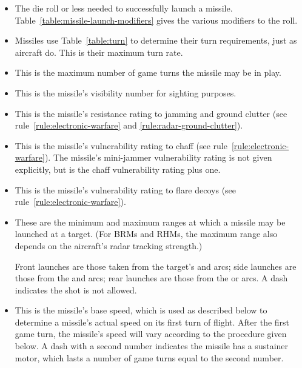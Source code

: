 {\begin{itemize}
    \item {} The die roll or less needed to successfully launch a missile. Table~\ref{table:missile-launch-modifiers} gives the various modifiers to the roll.

    \item {} Missiles use Table~\ref{table:turn} to determine their turn requirements, just as aircraft do. This is their maximum turn rate.

    \item {} This is the maximum number of game turns the missile may be in play.

    \item {} This is the missile’s visibility number for sighting purposes.

    \item {} This is the missile’s resistance rating to jamming and ground clutter (see rule~\ref{rule:electronic-warfare} and \ref{rule:radar-ground-clutter}).

    \item {} This is the missile’s vulnerability rating to chaff (see rule~\ref{rule:electronic-warfare}). The missile’s mini-jammer vulnerability rating is not given explicitly, but is the chaff vulnerability rating plus one.

    \item {} This is the missile’s vulnerability rating to flare decoys (see rule~\ref{rule:electronic-warfare}).

    \item {} These are the minimum and maximum ranges at which a missile may be launched at a target. (For BRMs and RHMs, the maximum range also depends on the aircraft’s radar tracking strength.)

    Front launches are those taken from the target’s  and  arcs; side launches are those from the  and  arcs; rear launches are those from the  or  arcs. A dash indicates the shot is not allowed.

    \item {} This is the missile’s base speed, which is used as described below to determine a missile’s actual speed on its first turn of flight. After the first game turn, the missile’s speed will vary according to the procedure given below. A dash with a second number indicates the missile has a sustainer motor, which lasts a number of game turns equal to the second number.


\end{itemize}}

